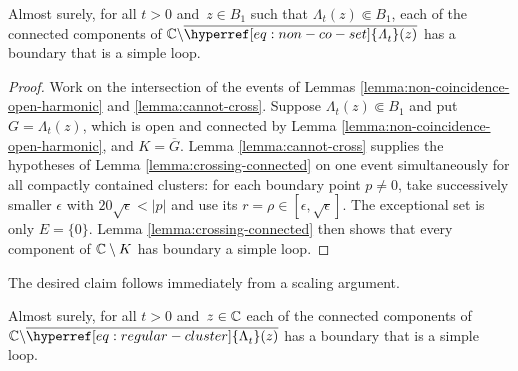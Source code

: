 \documentclass[12pt]{amsart}
\numberwithin{equation}{section}
\newcommand{\cluster}[2]{\hyperref[eq:non-co-set]{\mathit{\Lambda}^{#1}_{#2}}}
\newcommand{\regcluster}[2]{\hyperref[eq:regular-cluster]{\Lambda^{#1}_{#2}}}
\begin{document}
	\begin{prop} \label{prop:boundary-simple-loop}
		Almost surely, for all $t > 0$ and~$z \in B_1$ such that ${\cluster{}{t}(z)} \Subset B_1$, each of the connected components of $\C \backslash \overline{{{\cluster{}{t}(z)}}}$
		has a boundary that is a simple loop.
	\end{prop}
	\begin{proof}
		Work on the intersection of the events of Lemmas \ref{lemma:non-coincidence-open-harmonic} and \ref{lemma:cannot-cross}.
		Suppose ${\cluster{}{t}(z)} \Subset B_1$ and put $G = {\cluster{}{t}(z)}$, which is open and connected by
		Lemma \ref{lemma:non-coincidence-open-harmonic}, and $K = \overline G$.
		Lemma \ref{lemma:cannot-cross} supplies the hypotheses of Lemma \ref{lemma:crossing-connected} on one event simultaneously
		for all compactly contained clusters: for each boundary point $p\ne0$, take successively smaller $\epsilon$ with
		$20\sqrt\epsilon<|p|$ and use its $r=\rho\in[\epsilon,\sqrt\epsilon]$. The exceptional set is only $E=\{0\}$.
		Lemma \ref{lemma:crossing-connected} then shows that every component of $\mathbb{C}\setminus K$ has boundary a simple loop.
	\end{proof}
	
	The desired claim follows immediately from a scaling argument. 
	\begin{prop} \label{prop:boundary-simple-loop-full-cluster}
		Almost surely, for all $t > 0$ and~$z \in \mathbb{C}$ each of the connected components of $\C \backslash \overline{{\regcluster{}{t}}(z)}$
		has a boundary that is a simple loop.
	\end{prop}
	
\end{document}
